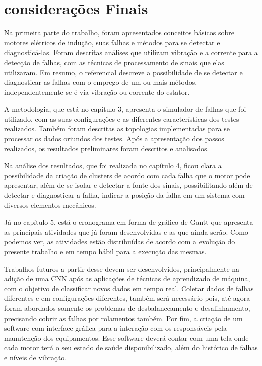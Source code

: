 
\chapter[Considerações Finais]{considerações Finais}

Na primeira parte do trabalho, foram apresentados conceitos básicos sobre motores elétricos de indução, suas falhas e métodos para se 
detectar e diagnosticá-las. Foram descritas análises que utilizam vibração e a corrente para a detecção de falhas, com as
técnicas de processamento de sinais que elas utilizaram. Em resumo, o referencial descreve a possibilidade de se detectar e diagnosticar 
as falhas com o emprego de um ou mais métodos, independentemente se é via vibração ou corrente do estator.

A metodologia, que está no capítulo 3, apresenta o simulador de falhas que foi utilizado, com as suas configurações e as
diferentes características dos testes realizados. Também foram descritas as topologias implementadas para se processar os dados oriundos 
dos testes. Após a apresentação dos passos realizados, os resultados preliminares foram descritos e analisados.

Na análise dos resultados, que foi realizada no capítulo 4, ficou clara a possibilidade da criação de clusters de acordo com cada falha
que o motor pode apresentar, além de se isolar e detectar a fonte dos sinais, possibilitando além de detectar e diagnosticar a falha,
indicar a posição da falha em um sistema com diversos elementos mecânicos.

Já no capítulo 5, está o cronograma em forma de gráfico de Gantt que apresenta as principais atividades que já foram desenvolvidas
e as que ainda serão. Como podemos ver, as atividades estão distribuídas de acordo com a evolução do presente trabalho e em tempo hábil
para a execução das mesmas.

Trabalhos futuros a partir desse devem ser desenvolvidos, principalmente na adição de uma CNN após as aplicações de técnicas de aprendizado
de máquina, com o objetivo de classificar novos dados em tempo real. Coletar dados de falhas diferentes e em configurações diferentes, também 
será necessário pois, até agora foram abordados somente os problemas de desbalanceamento e desalinhamento, precisando cobrir as falhas por
rolamentos também. Por fim, a criação de um software com interface gráfica para a interação com os responsáveis pela manutenção dos
equipamentos. Esse software deverá contar com uma tela onde cada motor terá o seu estado de saúde disponibilizado, além do histórico
de falhas e níveis de vibração.






